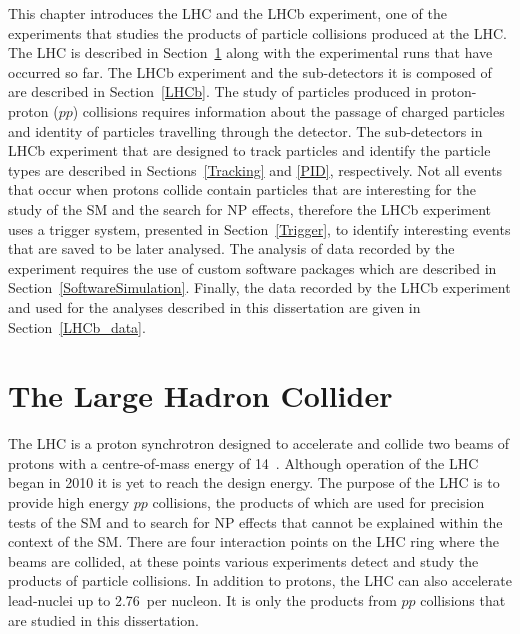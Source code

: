 This chapter introduces the LHC and the LHCb experiment, one of the experiments that studies the products of particle collisions produced at the LHC.
The LHC is described in Section~\ref{LHC} along with the experimental runs that have occurred so far. The LHCb experiment and the sub-detectors it is composed of are described in Section~\ref{LHCb}.
The study of particles produced in proton-proton ($pp$) collisions requires information about the passage of charged particles and identity of particles travelling through the detector. The sub-detectors in LHCb experiment that are designed to track particles and identify the particle types are described in Sections~\ref{Tracking} and \ref{PID}, respectively.
Not all events that occur when protons collide contain particles that are interesting for the study of the SM and the search for NP effects, therefore the LHCb experiment uses a trigger system, presented in Section~\ref{Trigger}, to identify interesting events that are saved to be later analysed. The analysis of data recorded by the experiment requires the use of custom software packages which are described in Section~\ref{SoftwareSimulation}. Finally, the data recorded by the LHCb experiment and used for the analyses described in this dissertation are given in Section~\ref{LHCb_data}. 
 
\section{The Large Hadron Collider}
\label{LHC}


The LHC is a proton synchrotron designed to accelerate and collide two beams of protons with a centre-of-mass energy of 14~\tev. Although operation of the LHC began in 2010 it is yet to reach the design energy. The purpose of the LHC is to provide high energy $pp$ collisions, the products of which are used for precision tests of the SM and to search for NP effects that cannot be explained within the context of the SM. %
There are four interaction points on the LHC ring where the beams are collided, at these points various experiments detect and study the products of particle collisions. In addition to protons, the LHC can also accelerate lead-nuclei up to 2.76~\tev per nucleon. It is only the products from $pp$ collisions that are studied in this dissertation.

